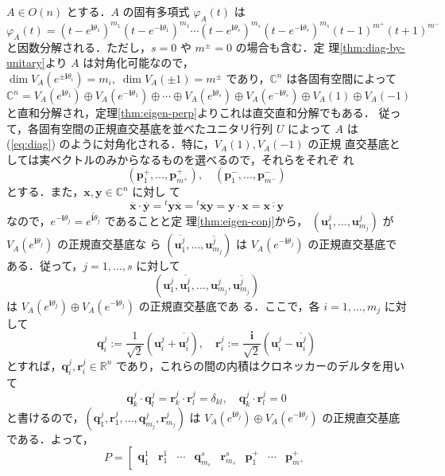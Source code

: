 \documentclass[11pt, uplatex, dvipdfmx, titlepage]{jsarticle}
\makeatletter
\renewcommand{\i}{\mathbf{i}}
\renewcommand{\bar}[1]{\overline{#1}}
\renewenvironment{proof}[1][\proofname]{\par
  \pushQED{\qed}%
  \normalfont \topsep6\p@\@plus6\p@\relax
  \trivlist
  \item[\hskip\labelsep
         \bfseries
    {#1}]\ignorespaces
}{%
  \popQED\endtrivlist\@endpefalse
}
\theoremstyle{definition}
\renewcommand{\proofname}{\textbf{証明}}
\makeatother
\begin{document}
\begin{proof}[定理\ref{thm:stdform}の証明]
  $A \in O(n)$ とする．$A$ の固有多項式 $\varphi_A(t)$ は
\[
  \varphi_A(t) =(t-e^{\i
    \theta_1})^{m_1}(t-e^{-\i\theta_1})^{m_1} \cdots (t-e^{\i \theta_s})^{m_s}(t-e^{-\i
    \theta_s})^{m_s}(t-1)^{m^{+}} (t+1)^{m^{-}} 
\]
と因数分解される．ただし，$s=0$ や $m^{\pm}=0$ の場合も含む．定
理\ref{thm:diag-by-unitary}より $A$
は対角化可能なので，$\dim V_A(e^{ \pm \i
  \theta_i}) = m_i, \; \dim V_A(\pm 1) = m^{\pm}$ であり，$\mathbb{C}^{n}$ は各固有空間によって
\[
  \mathbb{C}^n = V_A(e^{\i \theta_1}) \oplus  V_A(e^{-\i\theta_1}) \oplus \cdots \oplus
  V_A(e^{\i\theta_s}) \oplus V_A(e^{-\i \theta_s}) \oplus V_A(1) \oplus V_A(-1) 
\]
と直和分解され，定理\ref{thm:eigen-perp}よりこれは直交直和分解でもある．
従って，各固有空間の正規直交基底を並べたユニタリ行列 $U$ によって $A$
は (\ref{eq:diag}) のように対角化される．特に，$V_A(1), V_A(-1)$ の正規
直交基底としては実ベクトルのみからなるものを選べるので，それらをそれぞ
れ
\[
  \left(\bm{p}^{+}_1, \ldots, \bm{p}^{+}_{m^{+}} \right), \quad \left(
      \bm{p}_1^{-}, \ldots, \bm{p}^{-}_{m^{-}}\right)
\]
とする．また，$\bm{x}, \bm{y} \in \mathbb{C}^n$ に対し
て
\[
  \bar{\bm{x}}\cdot \bar{\bm{y}} = {}^{t}\bm{y} \bar{\bm{x}} =
  {}^{t}\bar{\bm{x}} \bm{y} = \bm{y}\cdot \bm{x} =\bar{\bm{x}\cdot \bm{y}}
\]
なので，$e^{-\i\theta_j} = \bar{e^{\i\theta_j}}$ であることと定
理\ref{thm:eigen-conj}から， $(\bm{u}^j_1, \ldots,
\bm{u}^j_{m_j})$ が $V_A(e^{\i \theta_j})$ の正規直交基底な
ら $(\bar{\bm{u}^j_1}, \ldots, \bar{\bm{u}^j_{m_j}})$ は
$V_A(e^{-\i \theta_j})$
の正規直交基底である．従って，$j=1, \ldots, s$ に対して
\[
  ( \bm{u}^j_1, \bar{\bm{u}^j_1}, \ldots,
  \bm{u}^j_{m_j}, \bar{\bm{u}^{j}_{m_j}}) 
\]
は $V_A(e^{\i \theta_j}) \oplus V_A(e^{-\i \theta_j})$ の正規直交基底であ
る．ここで，各 $i=1,\ldots, m_j$ に対して
\[
  \bm{q}^j_{i} := \frac{1}{\sqrt{2}}\left( \bm{u}^j_i + \bar{\bm{u}^j_i}\right), \quad
  \bm{r}^{j}_{i}:=\frac{\i}{\sqrt{2}}\left( \bm{u}^j_i - \bar{\bm{u}^j_i}\right)
\]
とすれば，$\bm{q}^j_i, \bm{r}^j_i \in \mathbb{R}^n$ であり，これらの間の内積はクロネッカーのデルタを用いて
\[
  \bm{q}^j_k \cdot \bm{q}^j_l = \bm{r}^j_k \cdot  \bm{r}^j_l=\delta_{kl}, \quad \bm{q}^j_k \cdot  \bm{r}^j_l= 0
\]
と書けるので，$(\bm{q}^j_1, \bm{r}^j_1, \ldots, \bm{q}^j_{m_j},
\bm{r}^j_{m_j})$ は $V_A(e^{\i\theta_j}) \oplus V_A(e^{-\i\theta_j})$
の正規直交基底である．よって，
\[
  P=\left[
    \begin{array}{ccccccccccc}
      \bm{q}^1_1 & \bm{r}^1_1 & \cdots & \bm{q}^s_{m_s} & \bm{r}^s_{m_s} & \bm{p}^{+}_1 & \cdots & \bm{p}^{+}_{m^+}

\end{array}\]
\end{proof}
\end{document}
